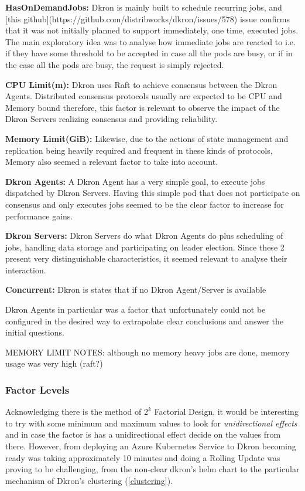 \documentclass[runningheads]{llncs}
\begin{document}
\par \textbf{HasOnDemandJobs:} Dkron is mainly built to schedule recurring jobs,
and [this github](https://github.com/distribworks/dkron/issues/578) issue confirms that it was not initially planned to support immediately,
one time, executed jobs. The main exploratory idea was to analyse how immediate jobs are reacted to
i.e. if they have some threshold to be accepted in case all the pods are busy, or if in the case
all the pods are busy, the request is simply rejected.
\par \textbf{CPU Limit(m):} Dkron uses Raft to achieve consensus between the Dkron Agents.
Distributed consensus protocols usually are expected to be CPU and Memory bound therefore,
this factor is relevant to observe the impact of the Dkron Servers realizing consensus and
providing reliability.
\par \textbf{Memory Limit(GiB):} Likewise, due to the actions of state management and replication
being heavily required and frequent in these kinds of protocols, Memory also seemed a relevant
factor to take into account.
\par \textbf{Dkron Agents:} A Dkron Agent has a very simple goal, to execute jobs dispatched by
Dkron Servers. Having this simple pod that does not participate on consensus and only executes jobs
seemed to be the clear factor to increase for performance gains.
\par \textbf{Dkron Servers:} Dkron Servers do what Dkron Agents do plus scheduling of jobs,
handling data storage and participating on leader election. Since these 2 present very
distinguishable characteristics, it seemed relevant to analyse their interaction.
\par \textbf{Concurrent:} Dkron is states that if no Dkron Agent/Server is available

Dkron Agents in particular was a factor that unfortunately could not be configured in the
desired way to extrapolate clear conclusions and answer the initial questions.


MEMORY LIMIT NOTES: although no memory heavy jobs are done, memory usage was very high (raft?)



\subsubsection{Factor Levels}
Acknowledging there is the method of $2^k$ Factorial Design, it would be interesting to
try with some minimum and maximum values to look for \textit{unidirectional effects} and
in case the factor is has a unidirectional effect decide on the values from there. However,
from deploying an Azure Kubernetes Service to Dkron becoming ready was taking approximately
10 minutes and doing a Rolling Update was proving to be challenging, from the non-clear dkron's
helm chart to the particular mechanism of Dkron's clustering (\ref{clustering}).
\end{document}
